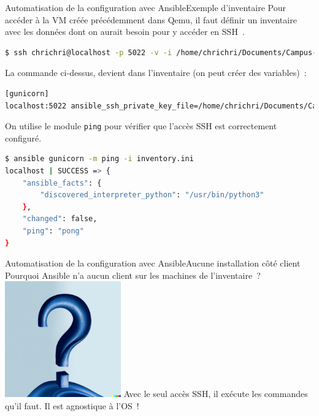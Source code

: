 \documentclass{beamer}
\begin{document}
    \begin{frame}[fragile]{Automatisation de la configuration avec Ansible}{Exemple d'inventaire}
        Pour accéder à la VM créée précédemment dans Qemu, il faut définir un inventaire avec les données dont on aurait besoin pour y accéder en SSH~.
        \begin{lstlisting}[language=bash,basicstyle=\ttfamily\tiny]
$ ssh chrichri@localhost -p 5022 -v -i /home/chrichri/Documents/Campus-St-Michel-IT/production-deployment/virt-ubuntu
        \end{lstlisting}
        La commande ci-dessus, devient dans l'inventaire (on peut créer des variables)~:
        \begin{lstlisting}[language=bash,basicstyle=\ttfamily\tiny]
[gunicorn]
localhost:5022 ansible_ssh_private_key_file=/home/chrichri/Documents/Campus-St-Michel-IT/production-deployment/virt-ubuntu ansible_ssh_user=chrichri
        \end{lstlisting}
        On utilise le module \lstinline{ping} pour vérifier que l'accès SSH est correctement configuré.
        \begin{lstlisting}[language=bash,basicstyle=\ttfamily\tiny]
$ ansible gunicorn -m ping -i inventory.ini
localhost | SUCCESS => {
    "ansible_facts": {
        "discovered_interpreter_python": "/usr/bin/python3"
    },
    "changed": false,
    "ping": "pong"
}
        \end{lstlisting}
    \end{frame}

    \begin{frame}{Automatisation de la configuration avec Ansible}{Aucune installation côté client}
        Pourquoi Ansible n'a aucun client sur les machines de l'inventaire~?
        \bigbreak
        \centering
        \includegraphics[width=5cm]{image/question-mark-on-a-blank-background}
        \bigbreak
        \pause
        \flushleft
        Avec le seul accès SSH, il exécute les commandes qu'il faut.
        Il est agnostique à l'OS~!
    \end{frame}
\end{document}
